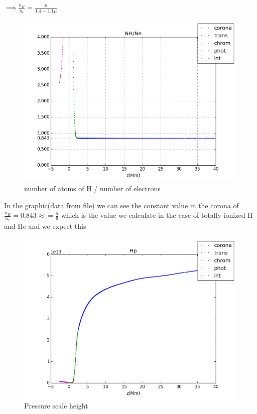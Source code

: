 \documentclass[10pt]{book}
\begin{document}
$\implies \frac{n_H}{n_e} =  \frac{\mu}{1.4 - 1.1 \mu }   $


 

\begin{figure}[!ht]
 \centering
 \includegraphics[scale=0.5]{nHDivNe.png}
 \caption{number of atoms of H / number of electrons }
\end{figure}

In the graphic(data from file) we can see the constant value in the corona of $\frac{n_H}{n_e} = 0.843 \approx = \frac{5}{6}$ 
which is the value we calculate in the case of totally ionized H and He and we expect this

\begin{figure}[!ht]
 \centering
 \includegraphics[scale=0.5]{hpLayers.png}
 \caption{Pressure scale height}
\end{figure}
\end{document}
